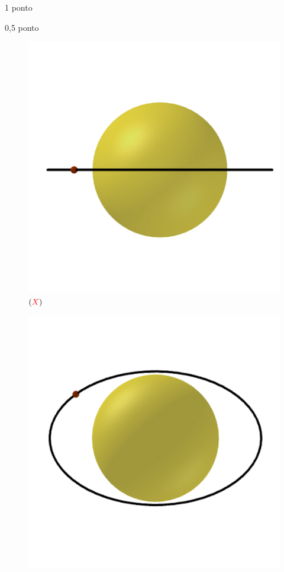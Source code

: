 \documentclass{../lista}
\begin{document}
\begin{questao}{1 ponto}
\begin{pergunta}{0,5 ponto}
			\begin{multicols}{3}
				\begin{figure}[H]
					\centering
					\includegraphics[scale=0.2]{./img/5b1.png}
					\captionsetup{labelformat=empty}
					\caption{$(\textcolor{red}{X})$}
				\end{figure}
				\begin{figure}[H]
					\centering
					\includegraphics[scale=0.2]{./img/5b2.png}

\end{figure}
\end{multicols}
\end{pergunta}
\end{questao}
\end{document}
